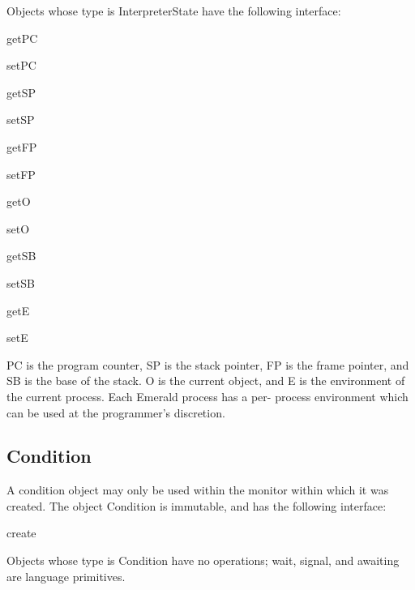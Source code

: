 Objects whose type is InterpreterState have the following interface:

\begin{desc}
  \item[\kw{function}  getPC \returns{} \/\LB{}\tn{Integer}\/\RB{}]
  \item[\kw{operation} setPC\/\LB{}\tn{Integer}\/\RB{}]
  \item[\kw{function}  getSP \returns{} \/\LB{}\tn{Integer}\/\RB{}]
  \item[\kw{operation} setSP\/\LB{}\tn{Integer}\/\RB{}]
  \item[\kw{function}  getFP \returns{} \/\LB{}\tn{Integer}\/\RB{}]
  \item[\kw{operation} setFP\/\LB{}\tn{Integer}\/\RB{}]
  \item[\kw{function}  getO \returns{} \/\LB{}\tn{Any}\/\RB{}]
  \item[\kw{operation} setO\/\LB{}\tn{Any}\/\RB{}]
  \item[\kw{function}  getSB \returns{} \/\LB{}\tn{Integer}\/\RB{}]
  \item[\kw{operation} setSB\/\LB{}\tn{Integer}\/\RB{}]
  \item[\kw{function}  getE \returns{} \/\LB{}\tn{Any}\/\RB{}]
  \item[\kw{operation} setE\/\LB{}\tn{Any}\/\RB{}]
\end{desc}

PC is the program counter, SP is the stack pointer, FP is the frame pointer,
and SB is the base of the stack.  O is the current object, and E is the
environment of the current process.  Each Emerald process has a per-
process environment which can be used at the programmer's discretion.

\subsection{Condition}
\label{builtin Condition}

A condition object may only be used within the monitor within
which it was created.
The object Condition is immutable, and has the following interface:

\begin{desc}
  \item[\kw{operation} create \returns{} \/\LB{}\tn{Condition}\/\RB{}]
\end{desc}

Objects whose type is Condition have no operations;  wait, signal, and
awaiting are language primitives.


